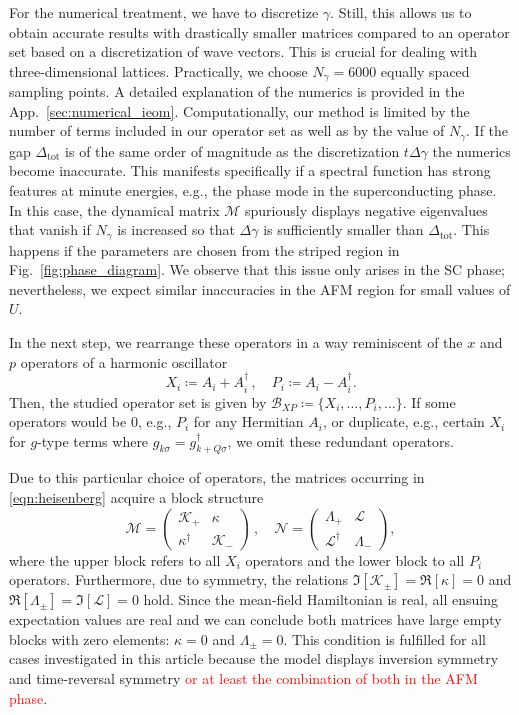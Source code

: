 \documentclass[
    reprint, 
    aps,
    preprintnumbers,
    twocolumn,
    prb,
    superscriptaddress
]{revtex4-2}
\newcommand{\mM}{\mathcal{M}}
\newcommand{\mN}{\mathcal{N}}
\newcommand{\red}[1]{\textcolor{red}{#1}}
\begin{document}
For the numerical treatment, we have to discretize $\gamma$.
Still, this allows us to obtain accurate results with drastically smaller matrices 
compared to an operator set based on a discretization of wave vectors.
This is crucial for dealing with three-dimensional lattices.
Practically, we choose $N_\gamma = 6000$ equally spaced sampling points.
A detailed explanation of the numerics is provided in the App.\ \ref{sec:numerical_ieom}.
Computationally, our method is limited by the number of terms included in our operator set 
as well as by the value of $N_\gamma$.
If the gap $\Delta_\text{tot}$ is of the same order of magnitude as the discretization $t \Delta \gamma$ the numerics become inaccurate.
This manifests specifically if a spectral function has strong features at minute energies, e.g., 
the phase mode in the superconducting phase.
In this case, the dynamical matrix $\mM$ spuriously displays negative eigenvalues that vanish if 
$N_\gamma$ is increased so that $\Delta \gamma$ is sufficiently smaller than $\Delta_\text{tot}$.
This happens if the parameters are chosen from the striped region in Fig.\ \ref{fig:phase_diagram}.
We observe that this issue only arises in the SC phase;
nevertheless, we expect similar inaccuracies in the AFM region for small values of $U$.

In the next step, we rearrange these operators in a way reminiscent of the $x$ and $p$ operators
of a harmonic oscillator
\begin{equation}
    X_i \coloneqq  A_i + A_i^\dagger\,,\quad P_i \coloneqq  A_i - A_i^\dagger.
\end{equation}
Then, the studied operator set is given by $\mathcal{B}_{XP} \coloneqq \{ X_i, \ldots, P_i, \ldots \}$.
If some operators would be 0, e.g., $P_i$ for any Hermitian $A_i$, or duplicate, e.g., certain $X_i$ for $g$-type terms where $g_{k\sigma} = g_{k+Q\sigma}^\dagger$, we omit these redundant operators.

Due to this particular choice of operators, the matrices occurring in \eqref{eqn:heisenberg} acquire a block structure
\begin{equation}
    \label{eqn:xp_set}
    \mM = \begin{pmatrix}
        \mathcal{K}_+ & \kappa \\ \kappa^\dagger & \mathcal{K}_-
    \end{pmatrix}\,,\quad \mN = \begin{pmatrix}
        \Lambda_+ & \mathcal{L} \\ \mathcal{L}^\dagger & \Lambda_-
    \end{pmatrix},
\end{equation}
where the upper block refers to all $X_i$ operators and the lower block to all $P_i$ operators.
Furthermore, due to symmetry, the relations $\Im [\mathcal{K}_\pm] = \Re [\kappa] = 0$ and $\Re [\Lambda_\pm] = \Im [\mathcal{L}] = 0$ hold.
Since the mean-field Hamiltonian is real, all ensuing expectation values are real
and we can conclude both matrices have large empty blocks with zero elements: $\kappa=0$ and $\Lambda_\pm=0$.
This condition is fulfilled for all cases investigated in this article because the model displays
inversion symmetry and time-reversal symmetry \red{or at least the combination of both in the AFM phase}.
\end{document}
